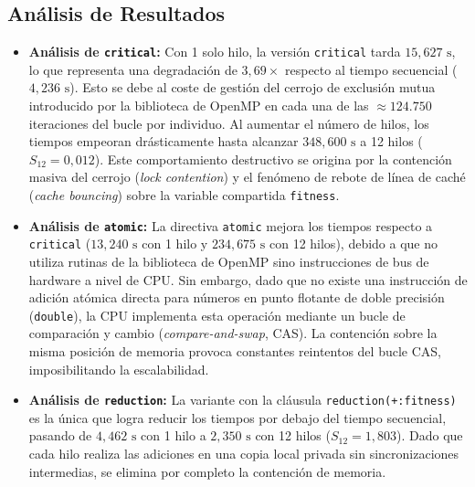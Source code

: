 \documentclass[12pt]{article}
\begin{document}
\begin{enumerate}
\subsection*{Análisis de Resultados}

\begin{itemize}
    \item \textbf{Análisis de \texttt{critical}:} 
    Con 1 solo hilo, la versión \texttt{critical} tarda $15,627\text{ s}$, lo que representa una degradación de $3,69\times$ respecto al tiempo secuencial ($4,236\text{ s}$). Esto se debe al coste de gestión del cerrojo de exclusión mutua introducido por la biblioteca de OpenMP en cada una de las $\approx 124.750$ iteraciones del bucle por individuo. Al aumentar el número de hilos, los tiempos empeoran drásticamente hasta alcanzar $348,600\text{ s}$ a 12 hilos ($S_{12} = 0,012$). Este comportamiento destructivo se origina por la contención masiva del cerrojo (\textit{lock contention}) y el fenómeno de rebote de línea de caché (\textit{cache bouncing}) sobre la variable compartida \texttt{fitness}.

    \item \textbf{Análisis de \texttt{atomic}:} 
    La directiva \texttt{atomic} mejora los tiempos respecto a \texttt{critical} ($13,240\text{ s}$ con 1 hilo y $234,675\text{ s}$ con 12 hilos), debido a que no utiliza rutinas de la biblioteca de OpenMP sino instrucciones de bus de hardware a nivel de CPU. Sin embargo, dado que no existe una instrucción de adición atómica directa para números en punto flotante de doble precisión (\texttt{double}), la CPU implementa esta operación mediante un bucle de comparación y cambio (\textit{compare-and-swap}, CAS). La contención sobre la misma posición de memoria provoca constantes reintentos del bucle CAS, imposibilitando la escalabilidad.

    \item \textbf{Análisis de \texttt{reduction}:} 
    La variante con la cláusula \texttt{reduction(+:fitness)} es la única que logra reducir los tiempos por debajo del tiempo secuencial, pasando de $4,462\text{ s}$ con 1 hilo a $2,350\text{ s}$ con 12 hilos ($S_{12} = 1,803$). Dado que cada hilo realiza las adiciones en una copia local privada sin sincronizaciones intermedias, se elimina por completo la contención de memoria.
\end{itemize}
\begin{figure}[htbp]
    \centering
\end{figure}
\end{enumerate}
\end{document}

